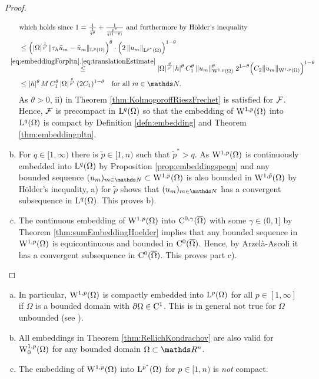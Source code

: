 \begin{proof}
\begin{enumerate}[a)]
\begin{align*}
        \intertext{which holds since $1 = \frac{1}{\frac{1}{q\theta}} + \frac{1}{\frac{p^*}{q(1 - \theta)}}$ and furthermore by Hölder's inequality}
        &\leq \Big( |\Omega|^{\frac{1}{p'}} \|\tau_h \tilde u_m - \tilde u_m \|_{\Ell^p(\Omega)} \Big)^\theta \cdot \Big( 2\, \|u_m \|_{\Ell^{p^*}(\Omega)} \Big)^{1 - \theta} \\
        &\hspace{-1.5em}\overset{\eqref{eq:embeddingForpltn},\eqref{eq:translationEstimate}} \leq |\Omega|^{\frac{\theta}{p'}} |h|^\theta \, C_1^\theta \, \|u_m\|_{\WW^{1,p}(\Omega)}^\theta \; 2^{1 - \theta} \Big( C_2 \|u_m\|_{\WW^{1,p}(\Omega)} \Big)^{1 - \theta} \\
        &\leq |h|^\theta \, M \, C_1^\theta \, |\Omega|^{\frac{\theta}{p'}} \, (2C_1)^{1 - \theta} \quad\text{for all } m \in \N.
        \end{align*}
        As $\theta > 0$, ii) in Theorem \ref{thm:KolmogoroffRieszFrechet} is satisfied for $\mathcal{F}$.
        Hence, $\mathcal{F}$ is precompact in $\mathrm{L}^q(\Omega)$ so that the embedding of $\mathrm{W}^{1,p}(\Omega)$ into $\mathrm{L}^q(\Omega)$ is compact by Definition \ref{defn:embedding} and Theorem \ref{thm:embeddingpltn}.

      \item For $q \in [1,\infty)$ there is $\tilde p \in [1,n)$ such that $\tilde p^* > q$.
          As $\mathrm{W}^{1,p}(\Omega)$ is continuously embedded into $\mathrm{L}^q(\Omega)$ by Proposition \ref{prop:embeddingspeqn} and any bounded sequence $(u_m)_{m \in \N} \subset \WW^{1,p}(\Omega)$ is also bounded in $\mathrm{W}^{1,\tilde p}(\Omega)$ by Hölder's inequality, a) for $\tilde p$ shows that $(u_m)_{m \in \N}$ has a convergent subsequence in $\mathrm{L}^q(\Omega)$.
          This proves b).

      \item The continuous embedding of $\mathrm{W}^{1,p}(\Omega)$ into $\mathrm{C}^{0,\gamma}(\overline\Omega)$ with some $\gamma \in (0,1]$ by Theorem \ref{thm:sumEmbeddingHoelder} implies that any bounded sequence in $\mathrm{W}^{1,p}(\Omega)$ is equicontinuous and bounded in $\mathrm{C}^0(\overline\Omega)$.
        Hence, by Arzel\`a-Ascoli it has a convergent subsequence in $\mathrm{C}^0(\overline\Omega)$.
        This proves part c). \qedhere
  \end{enumerate}
\end{proof}

\begin{rem}
  \begin{enumerate}[a)]
    \item In particular, $\mathrm{W}^{1,p}(\Omega)$ is compactly embedded into $\mathrm{L}^p(\Omega)$ for all $p \in [1,\infty]$ if $\Omega$ is a bounded domain with $\partial\Omega \in \mathrm{C}^1$.
      This is in general not true for $\Omega$ unbounded (see \cite{adams2003sobolev}).
    \item All embeddings in Theorem \ref{thm:RellichKondrachov} are also valid for $\mathrm{W}_0^{1,p}(\Omega)$ for any bounded domain $\Omega \subset \R^n$.
    \item The embedding of $\mathrm{W}^{1,p}(\Omega)$ into $\mathrm{L}^{p^*}(\Omega)$ for $p \in [1,n)$ is \emph{not} compact.
  \end{enumerate}
\end{rem}
